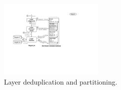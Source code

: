 
\begin{figure}[t]
	\centering
	\centering
	\includegraphics[width=0.45\textwidth]{graphs/sys-architecture-put-layer.pdf}
	\caption{Layer deduplication and partitioning.}
	\label{fig:dedup-partition}
\end{figure}




